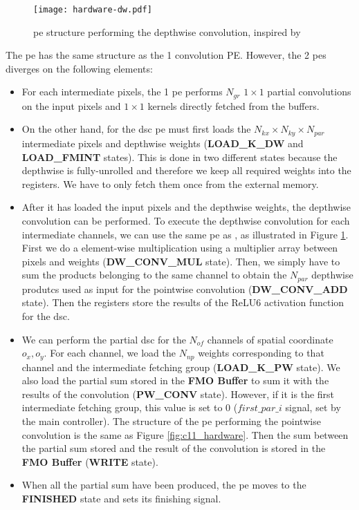\begin{figure}
    \centering
    \texttt{[image: hardware-dw.pdf]}
    \caption{\acrshort{pe} structure performing the depthwise convolution, inspired by \cite{bai_cnn_2018}}
    \label{fig:dsc_hardware}
\end{figure}
%
The \acrshort{pe} has the same structure as the 1 convolution PE. However, the 2 \acrshort{pe}s diverges on the following elements:
\begin{itemize}
    \item For each intermediate pixels, the 1 \acrshort{pe} performs $N_{gr}$ $1 \times 1$ partial convolutions on the input pixels and $1 \times 1$ kernels directly fetched from the buffers.
    \item On the other hand, for the \acrshort{dsc} \acrshort{pe} must first loads the $N_{kx} \times N_{ky} \times N_{par}$ intermediate pixels and depthwise weights (\textbf{LOAD\_K\_DW} and \textbf{LOAD\_FMINT} states). This is done in two different states because the depthwise is fully-unrolled and therefore we keep all required weights into the registers. We have to only fetch them once from the external memory.
    \item After it has loaded the input pixels and the depthwise weights, the depthwise convolution can be performed. To execute the depthwise convolution for each intermediate channels, we can use the same \acrshort{pe} as \textcite{bai_cnn_2018}, as illustrated in Figure \ref{fig:dsc_hardware}. First we do a element-wise multiplication using a multiplier array between pixels and weights (\textbf{DW\_CONV\_MUL} state). Then, we simply have to sum the products belonging to the same channel to obtain the $N_{par}$ depthwise produtcs used as input for the pointwise convolution (\textbf{DW\_CONV\_ADD} state). Then the registers store the results of the ReLU6 activation function for the \acrshort{dsc}.
    \item We can perform the partial \acrshort{dsc} for the $N_{of}$ channels of spatial coordinate $o_x, o_y$. For each channel, we load the $N_{np}$ weights corresponding to that channel and the intermediate fetching group (\textbf{LOAD\_K\_PW} state). We also load the partial sum stored in the \textbf{FMO Buffer} to sum it with the results of the convolution (\textbf{PW\_CONV} state). However, if it is the first intermediate fetching group, this value is set to 0 ($first\_par\_i$ signal, set by the main controller).
    The structure of the \acrshort{pe} performing the pointwise convolution is the same as Figure \ref{fig:c11_hardware}. Then the sum between the partial sum stored and the result of the convolution is stored in the \textbf{FMO Buffer} (\textbf{WRITE} state).
    \item When all the partial sum have been produced, the \acrshort{pe} moves to the \textbf{FINISHED} state and sets its finishing signal.
\end{itemize}

